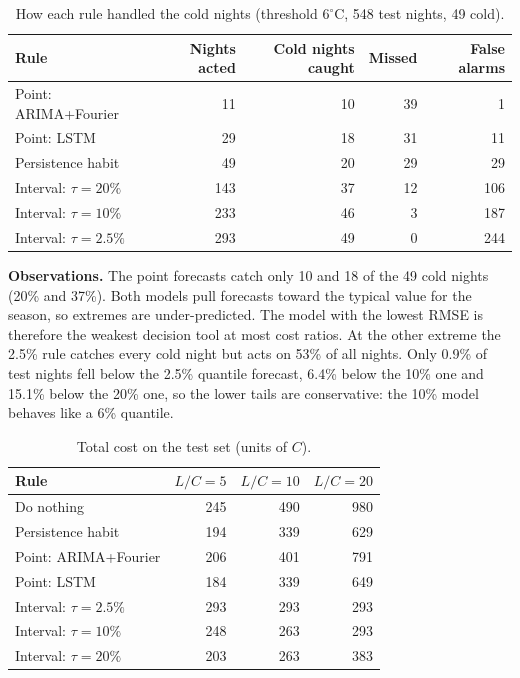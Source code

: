 \documentclass[11pt,a4paper]{article}
\begin{document}
\begin{table}[H]\centering
\caption{How each rule handled the cold nights (threshold $6^\circ$C, 548 test nights, 49 cold).}
\begin{tabular}{lrrrr}
\toprule
Rule & Nights acted & Cold nights caught & Missed & False alarms\\
\midrule
Point: ARIMA+Fourier & 11 & 10 & 39 & 1\\
Point: LSTM & 29 & 18 & 31 & 11\\
Persistence habit & 49 & 20 & 29 & 29\\
Interval: $\tau=20\%$ & 143 & 37 & 12 & 106\\
Interval: $\tau=10\%$ & 233 & 46 & 3 & 187\\
Interval: $\tau=2.5\%$ & 293 & 49 & 0 & 244\\
\bottomrule
\end{tabular}
\end{table}

\textbf{Observations.} The point forecasts catch only 10 and 18 of the 49 cold nights (20\% and 37\%). Both models pull forecasts toward the typical value for the season, so extremes are under-predicted. The model with the lowest RMSE is therefore the weakest decision tool at most cost ratios. At the other extreme the 2.5\% rule catches every cold night but acts on 53\% of all nights. Only 0.9\% of test nights fell below the 2.5\% quantile forecast, 6.4\% below the 10\% one and 15.1\% below the 20\% one, so the lower tails are conservative: the 10\% model behaves like a 6\% quantile.

\begin{table}[H]\centering
\caption{Total cost on the test set (units of $C$).}
\begin{tabular}{lrrr}
\toprule
Rule & $L/C=5$ & $L/C=10$ & $L/C=20$\\
\midrule
Do nothing & 245 & 490 & 980\\
Persistence habit & 194 & 339 & 629\\
Point: ARIMA+Fourier & 206 & 401 & 791\\
Point: LSTM & 184 & 339 & 649\\
Interval: $\tau=2.5\%$ & 293 & 293 & 293\\
Interval: $\tau=10\%$ & 248 & 263 & 293\\
Interval: $\tau=20\%$ & 203 & 263 & 383\\
\bottomrule
\end{tabular}
\end{table}
\end{document}
